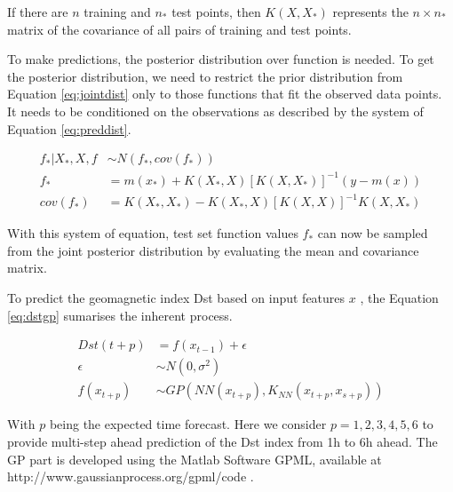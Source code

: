 If there are  \( n \)  training and  \( n_{\ast} \)  test points, then  \( K \left( X,X_{\ast} \right)  \)  
represents the  \( n \times n_{\ast} \)  matrix of the covariance of all pairs of training and test points. 



To make predictions, the posterior distribution over function is needed. To get the posterior distribution, 
we need to restrict the prior distribution from Equation \ref{eq:jointdist} only to those functions that 
fit the observed data points. It needs to be conditioned on the observations as described by 
the system of Equation \ref{eq:preddist}.



\begin{align}\label{eq:preddist}
 f_{\ast} \vert X_{\ast},X,f &\sim N \left( f_{\ast},cov \left( f_{\ast} \right)  \right)  \\ 
 f_{\ast} &= m \left( x_{\ast} \right) +K \left( X_{\ast},X \right)  \left[ K \left( X,X_{\ast}  \right)  \right] ^{-1} \left( y-m \left( x \right)  \right) \\ 
 cov \left( f_{\ast} \right) &= K \left( X_{\ast},X_{\ast} \right) -K \left( X_{\ast},X \right)  \left[ K \left( X,X \right)  \right] ^{-1} K \left( X,X_{\ast} \right) 
\end{align}

With this system of equation, test set function values  \( f_{\ast} \)  can now be sampled from the joint 
posterior distribution by evaluating the mean and covariance matrix. 



To predict the geomagnetic index Dst based on input features \( x \) , the Equation \ref{eq:dstgp} sumarises 
the inherent process. 



\begin{align}\label{eq:dstgp}
Dst \left( t+p \right) &= f \left( x_{t-1} \right) + \epsilon \\ 
\epsilon &\sim N \left( 0, \sigma ^{2} \right)  \\
f \left( x_{t+p} \right)  &\sim GP \left( NN \left( x_{t+p} \right) , K_{NN}(x_{t+p}, x_{s+p} ) \right)
\end{align}

With  \( p \)  being the expected time forecast. Here we 
consider $p  = {1,2,3,4,5,6}$ to provide multi-step ahead prediction 
of the Dst index from 1h to 6h ahead. The GP part is developed using the Matlab Software GPML, available 
at http://www.gaussianprocess.org/gpml/code \cite{rasmussen2010gaussian}.




